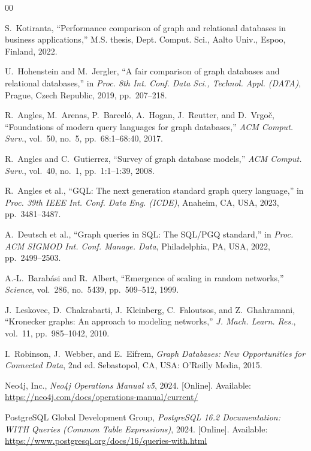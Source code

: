 \documentclass[conference,10pt]{IEEEtran}%
\begin{document}

\begin{thebibliography}{00}

S.~Kotiranta, ``Performance comparison of graph and relational databases in business applications,'' M.S. thesis, Dept. Comput. Sci., Aalto Univ., Espoo, Finland, 2022.

U.~Hohenstein and M.~Jergler, ``A fair comparison of graph databases and relational databases,'' in \emph{Proc. 8th Int. Conf. Data Sci., Technol. Appl. (DATA)}, Prague, Czech Republic, 2019, pp.~207--218.

R.~Angles, M.~Arenas, P.~Barcel{\'o}, A.~Hogan, J.~Reutter, and D.~Vrgo{\v{c}}, ``Foundations of modern query languages for graph databases,'' \emph{ACM Comput. Surv.}, vol.~50, no.~5, pp.~68:1--68:40, 2017.

R.~Angles and C.~Gutierrez, ``Survey of graph database models,'' \emph{ACM Comput. Surv.}, vol.~40, no.~1, pp.~1:1--1:39, 2008.

R.~Angles et al., ``GQL: The next generation standard graph query language,'' in \emph{Proc. 39th IEEE Int. Conf. Data Eng. (ICDE)}, Anaheim, CA, USA, 2023, pp.~3481--3487.

A.~Deutsch et al., ``Graph queries in SQL: The SQL/PGQ standard,'' in \emph{Proc. ACM SIGMOD Int. Conf. Manage. Data}, Philadelphia, PA, USA, 2022, pp.~2499--2503.

A.-L.~Barab{\'a}si and R.~Albert, ``Emergence of scaling in random networks,'' \emph{Science}, vol.~286, no.~5439, pp.~509--512, 1999.

J.~Leskovec, D.~Chakrabarti, J.~Kleinberg, C.~Faloutsos, and Z.~Ghahramani, ``Kronecker graphs: An approach to modeling networks,'' \emph{J. Mach. Learn. Res.}, vol.~11, pp.~985--1042, 2010.

I.~Robinson, J.~Webber, and E.~Eifrem, \emph{Graph Databases: New Opportunities for Connected Data}, 2nd ed. Sebastopol, CA, USA: O'Reilly Media, 2015.

Neo4j, Inc., \emph{Neo4j Operations Manual v5}, 2024. [Online]. Available: \url{https://neo4j.com/docs/operations-manual/current/}

PostgreSQL Global Development Group, \emph{PostgreSQL 16.2 Documentation: WITH Queries (Common Table Expressions)}, 2024. [Online]. Available: \url{https://www.postgresql.org/docs/16/queries-with.html}


\end{thebibliography}
\end{document}
